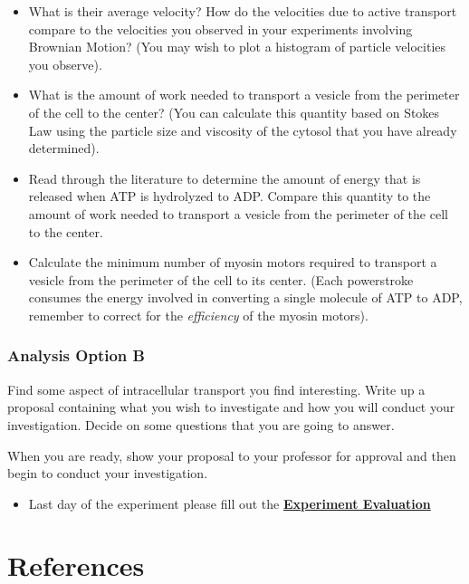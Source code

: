 \documentclass{../lab}
\begin{document}
\begin{itemize}
    \item What is their average velocity? How do the velocities due to active transport compare to the velocities you observed in your experiments involving Brownian Motion? (You may wish to plot a histogram of particle velocities you observe).

    \item What is the amount of work needed to transport a vesicle from the perimeter of the cell to the center? (You can calculate this quantity based on Stokes Law using the particle size and viscosity of the cytosol that you have already determined).

    \item Read through the literature to determine the amount of energy that is released when ATP is hydrolyzed to ADP. Compare this quantity to the amount of work needed to transport a vesicle from the perimeter of the cell to the center.

    \item Calculate the minimum number of myosin motors required to transport a vesicle from the perimeter of the cell to its center. (Each powerstroke consumes the energy involved in converting a single molecule of ATP to ADP, remember to correct for the \emph{efficiency} of the myosin motors).
\end{itemize}

\subsubsection{Analysis Option B}

Find some aspect of intracellular transport you find interesting. Write up a proposal containing what you wish to investigate and how you will conduct your investigation. Decide on some questions that you are going to answer.

When you are ready, show your proposal to your professor for approval and then begin to conduct your investigation.

\begin{itemize}
    \item Last day of the experiment please fill out the \href{\ExperimentEvaluation}{\textbf{Experiment Evaluation}}

\end{itemize}

\section{References}
\label{sec:References}
\end{document}
